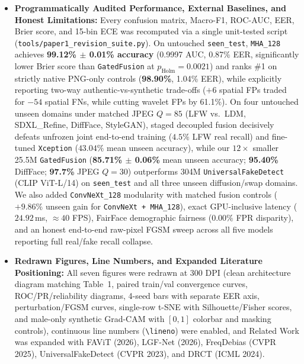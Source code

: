\documentclass[10pt,a4paper]{article}
\begin{document}
\begin{itemize}[leftmargin=1.4em,itemsep=3pt,topsep=3pt]
    \item \textbf{Programmatically Audited Performance, External Baselines, and Honest Limitations:} Every confusion matrix, Macro-F1, ROC-AUC, EER, Brier score, and 15-bin ECE was recomputed via a single unit-tested script (\texttt{tools/paper1\_\allowbreak revision\_\allowbreak suite.py}). On untouched \texttt{seen\_test}, \texttt{MHA\_128} achieves \textbf{99.12\% $\pm$ 0.01\% accuracy} (0.9997 AUC, 0.87\% EER, significantly lower Brier score than \texttt{GatedFusion} at $p_{\text{Holm}}=0.0021$) and ranks \#1 on strictly native PNG-only controls (\textbf{98.90\%}, 1.04\% EER), while explicitly reporting two-way authentic-vs-synthetic trade-offs ($+6$ spatial FPs traded for $-54$ spatial FNs, while cutting wavelet FPs by 61.1\%). On four untouched unseen domains under matched JPEG $Q=85$ (LFW vs.\ LDM, SDXL\_Refine, DiffFace, StyleGAN), staged decoupled fusion decisively defeats unfrozen joint end-to-end training ($4.5\%$ LFW real recall) and fine-tuned \texttt{Xception} ($43.04\%$ mean unseen accuracy), while our $12\times$ smaller 25.5M \texttt{GatedFusion} (\textbf{85.71\% $\pm$ 0.06\%} mean unseen accuracy; \textbf{95.40\%} DiffFace; \textbf{97.7\%} JPEG $Q=30$) outperforms 304M \texttt{UniversalFakeDetect} (CLIP ViT-L/14) on \texttt{seen\_test} and all three unseen diffusion/swap domains. We also added \texttt{ConvNeXt\_128} modularity with matched fusion controls ($+9.86\%$ unseen gain for \texttt{ConvNeXt + MHA\_128}), exact GPU-inclusive latency ($24.92\,$ms, $\approx 40$ FPS), FairFace demographic fairness ($0.00\%$ FPR disparity), and an honest end-to-end raw-pixel FGSM sweep across all five models reporting full real/fake recall collapse.
    \item \textbf{Redrawn Figures, Line Numbers, and Expanded Literature Positioning:} All seven figures were redrawn at 300 DPI (clean architecture diagram matching Table~1, paired train/val convergence curves, ROC/PR/reliability diagrams, 4-seed bars with separate EER axis, perturbation/FGSM curves, single-row t-SNE with Silhouette/Fisher scores, and male-only synthetic Grad-CAM with $[0,1]$ colorbar and masking controls), continuous line numbers (\texttt{\textbackslash lineno}) were enabled, and Related Work was expanded with FAViT (2026), LGF-Net (2026), FreqDebias (CVPR 2025), UniversalFakeDetect (CVPR 2023), and DRCT (ICML 2024).
\end{itemize}

\vspace{2pt}
\end{document}
